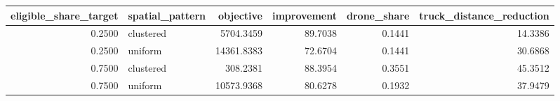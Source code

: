 \begin{tabular}{rlrrrr}
\toprule
eligible_share_target & spatial_pattern & objective & improvement & drone_share & truck_distance_reduction \\
\midrule
0.2500 & clustered & 5704.3459 & 89.7038 & 0.1441 & 14.3386 \\
0.2500 & uniform & 14361.8383 & 72.6704 & 0.1441 & 30.6868 \\
0.7500 & clustered & 308.2381 & 88.3954 & 0.3551 & 45.3512 \\
0.7500 & uniform & 10573.9368 & 80.6278 & 0.1932 & 37.9479 \\
\bottomrule
\end{tabular}
